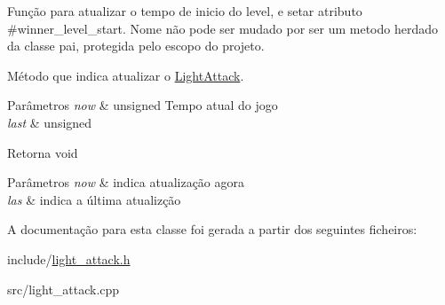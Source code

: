 Função para atualizar o tempo de inicio do level, e setar atributo \#winner\+\_\+level\+\_\+start. Nome não pode ser mudado por ser um metodo herdado da classe pai, protegida pelo escopo do projeto. 

Método que indica atualizar o \mbox{\hyperlink{classLightAttack}{Light\+Attack}}.


\begin{DoxyParams}{Parâmetros}
{\em now} & unsigned Tempo atual do jogo \\
\hline
{\em last} & unsigned \\
\hline
\end{DoxyParams}
\begin{DoxyReturn}{Retorna}
void
\end{DoxyReturn}

\begin{DoxyParams}{Parâmetros}
{\em now} & indica atualização agora \\
\hline
{\em las} & indica a última atualizção \\
\hline
\end{DoxyParams}


A documentação para esta classe foi gerada a partir dos seguintes ficheiros\+:\begin{DoxyCompactItemize}
\item 
include/\mbox{\hyperlink{light__attack_8h}{light\+\_\+attack.\+h}}\item 
src/light\+\_\+attack.\+cpp\end{DoxyCompactItemize}
